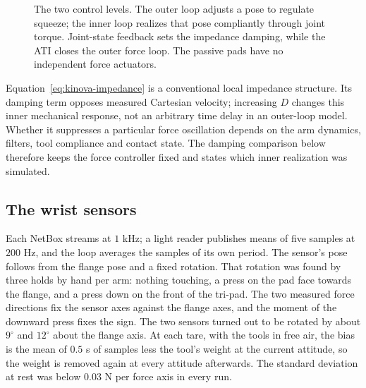 \begin{figure}[htbp]\centering
{}
\caption{The two control levels. The outer loop adjusts a pose to regulate squeeze; the inner loop realizes that pose compliantly through joint torque. Joint-state feedback sets the impedance damping, while the ATI closes the outer force loop. The passive pads have no independent force actuators.}
\label{fig:kinova-control-blocks}
\end{figure}

Equation~\eqref{eq:kinova-impedance} is a conventional local impedance structure. Its damping term opposes measured Cartesian velocity; increasing $D$ changes this inner mechanical response, not an arbitrary time delay in an outer-loop model. Whether it suppresses a particular force oscillation depends on the arm dynamics, filters, tool compliance and contact state. The damping comparison below therefore keeps the force controller fixed and states which inner realization was simulated.


\subsection{The wrist sensors}

Each NetBox streams at $1$ kHz; a light reader publishes means of five samples at $200$ Hz, and the loop averages the samples of its own period. The sensor's pose follows from the flange pose and a fixed rotation. That rotation was found by three holds by hand per arm: nothing touching, a press on the pad face towards the flange, and a press down on the front of the tri-pad. The two measured force directions fix the sensor axes against the flange axes, and the moment of the downward press fixes the sign. The two sensors turned out to be rotated by about $9^\circ$ and $12^\circ$ about the flange axis. At each tare, with the tools in free air, the bias is the mean of $0.5$ s of samples less the tool's weight at the current attitude, so the weight is removed again at every attitude afterwards. The standard deviation at rest was below $0.03$ N per force axis in every run.

